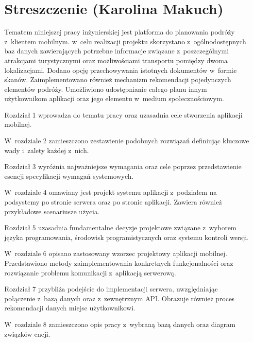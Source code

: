 \chapter*{Streszczenie (Karolina Makuch)}
 \par Tematem niniejszej pracy inżynierskiej jest platforma do planowania podróży z~klientem mobilnym. w~celu realizacji projektu skorzystano z~ogólnodostępnych baz danych zawierających potrzebne informacje związane z~poszczególnymi atrakcjami turystycznymi oraz możliwościami transportu pomiędzy dwoma lokalizacjami. Dodano opcję przechowywania istotnych dokumentów w~formie skanów. Zaimplementowano również mechanizm rekomendacji pojedynczych elementów podróży. Umożliwiono udostępnianie całego planu innym użytkownikom aplikacji oraz jego elementu w~medium społecznościowym.
 
 \par Rozdział 1 wprowadza do tematu pracy  oraz uzasadnia cele stworzenia aplikacji mobilnej. 
 
 \par W~rozdziale 2 zamieszczono zestawienie podobnych rozwiązań definiując kluczowe wady i~zalety każdej z~nich.

\par Rozdział 3 wyróżnia najważniejsze wymagania oraz cele poprzez przedstawienie esencji specyfikacji wymagań systemowych.

\par W~rozdziale 4 omawiany jest projekt systemu aplikacji z~podziałem na podsystemy po stronie serwera oraz po stronie aplikacji. Zawiera również przykładowe scenariusze użycia.

\par Rozdział 5 uzasadnia fundamentalne decyzje projektowe związane z~wyborem języka programowania, środowisk programistycznych oraz systemu kontroli wersji.

\par W~rozdziale 6 opisano zastosowany wzorzec projektowy aplikacji mobilnej. Przedstawiono metody zaimplementowania konkretnych funkcjonalności oraz rozwiązanie problemu komunikacji z~aplikacją serwerową. 

\par Rozdział 7 przybliża podejście do implementacji serwera, uwzględniając połączenie z~bazą danych oraz z~zewnętrznym API. Obrazuje również proces rekomendacji danych miejsc użytkownikowi.

\par W~rozdziale 8 zamieszczono opis pracy z~wybraną bazą danych oraz diagram związków encji.

